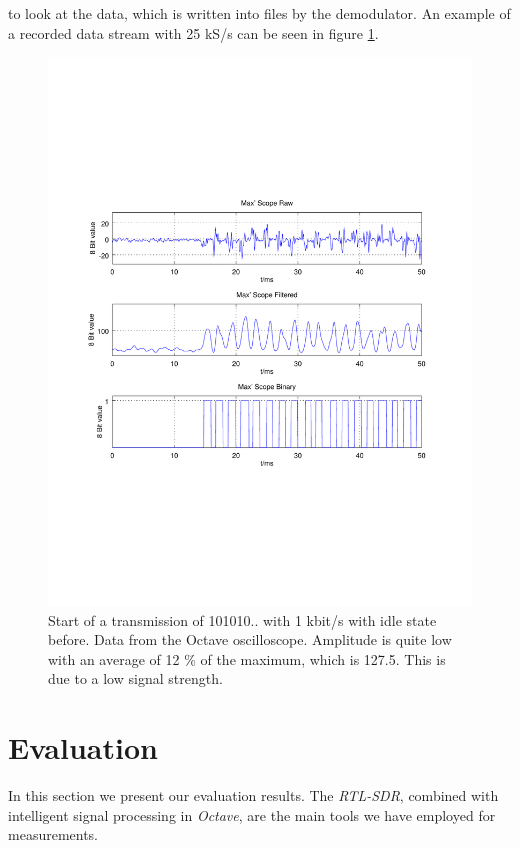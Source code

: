 \documentclass[conference]{IEEEtran}
\begin{document}
to look at the data, which is written into files by the demodulator. An
example of a recorded data stream with 25 kS/s can be seen in figure
\ref{fig:transmission}.  \begin{figure}[h]
\centering
\includegraphics[width=\columnwidth]{./fig/transmission}
\caption{Start of a transmission of 101010.. with 1 kbit/s with idle state before. Data from the Octave oscilloscope. Amplitude is quite low with an average of 12 \% of the maximum, which is 127.5. This is due to a low signal strength.}
\label{fig:transmission}
\end{figure}

\section{Evaluation}
In this section we present our evaluation results. The \textit{RTL-SDR},
combined with intelligent signal processing in \textit{Octave}, are the
main tools we have employed for measurements. 
\end{document}
